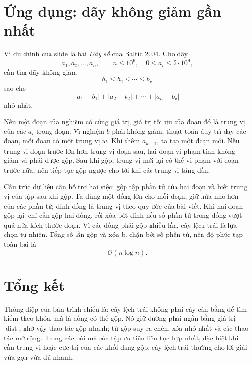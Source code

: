 \documentclass[11pt]{article}
\newcommand{\Oh}{\mathcal{O}}
\begin{document}
\section{Ứng dụng: dãy không giảm gần nhất}

Ví dụ chính của slide là bài \textit{Dãy số} của Baltic 2004. Cho dãy
\[
  a_1,a_2,\ldots,a_n,\qquad n\le 10^6,\quad 0\le a_i\le 2\cdot10^9,
\]
cần tìm dãy không giảm
\[
  b_1\le b_2\le\cdots\le b_n
\]
sao cho
\[
  |a_1-b_1|+|a_2-b_2|+\cdots+|a_n-b_n|
\]
nhỏ nhất.

Nếu một đoạn của nghiệm có cùng giá trị, giá trị tối ưu của đoạn đó là trung
vị của các \(a_i\) trong đoạn. Vì nghiệm \(b\) phải không giảm, thuật toán
duy trì dãy các đoạn, mỗi đoạn có một trung vị \(w\). Khi thêm \(a_{k+1}\),
ta tạo một đoạn mới. Nếu trung vị đoạn trước lớn hơn trung vị đoạn sau, hai
đoạn vi phạm tính không giảm và phải được gộp. Sau khi gộp, trung vị mới lại
có thể vi phạm với đoạn trước nữa, nên tiếp tục gộp ngược cho tới khi các
trung vị tăng dần.

Cấu trúc dữ liệu cần hỗ trợ hai việc: gộp tập phần tử của hai đoạn và biết
trung vị của tập sau khi gộp. Ta dùng một đống lớn cho mỗi đoạn, giữ nửa nhỏ
hơn của các phần tử; đỉnh đống là trung vị theo quy ước của bài viết. Khi hai
đoạn gộp lại, chỉ cần gộp hai đống, rồi xóa bớt đỉnh nếu số phần tử trong
đống vượt quá nửa kích thước đoạn. Vì các đống phải gộp nhiều lần, cây lệch
trái là lựa chọn tự nhiên. Tổng số lần gộp và xóa bị chặn bởi số phần tử, nên
độ phức tạp toàn bài là
\[
  \Oh(n\log n).
\]

\section{Tổng kết}

Thông điệp của bản trình chiếu là: cây lệch trái không phải cây cân bằng để
tìm kiếm theo khóa, mà là đống có thể gộp. Nó giữ đường phải ngắn bằng giá
trị \(\operatorname{dist}\), nhờ vậy thao tác gộp nhanh; từ gộp suy ra chèn,
xóa nhỏ nhất và các thao tác mở rộng. Trong các bài mà các tập ưu tiên liên
tục hợp nhất, đặc biệt khi cần trung vị hoặc cực trị của các khối đang gộp,
cây lệch trái thường cho lời giải vừa gọn vừa đủ nhanh.
\end{document}
